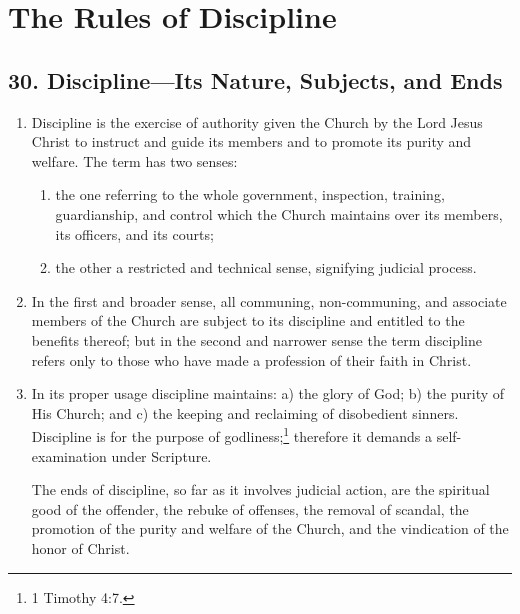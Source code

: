 \documentclass[
]{book}
\providecommand{\tightlist}{%
  \setlength{\itemsep}{0pt}\setlength{\parskip}{0pt}}
\begin{document}
\hypertarget{the-rules-of-discipline}{%
\chapter*{The Rules of Discipline}\label{the-rules-of-discipline}}

\hypertarget{disciplineits-nature-subjects-and-ends}{%
\section*{30. Discipline---Its Nature, Subjects, and Ends}\label{disciplineits-nature-subjects-and-ends}}

\protect\hypertarget{chapter-slug-30-discipline-its-nature-subjects-and-ends}{\href{}{}}

\begin{enumerate}
\def\labelenumi{\arabic{enumi}.}
\item
  \protect\hypertarget{30}{\href{}{}}Discipline is the exercise of authority given the Church by the Lord Jesus Christ to instruct and guide its members and to promote its purity and welfare. The term has two senses:

  \begin{enumerate}
  \def\labelenumii{\alph{enumii}.}
  \tightlist
  \item
    \protect\hypertarget{30.1.a}{\href{}{}}the one referring to the whole government, inspection, training, guardianship, and control which the Church maintains over its members, its officers, and its courts;
  \item
    the other a restricted and technical sense, signifying judicial process.
  \end{enumerate}
\item
  In the first and broader sense, all communing, non-communing, and associate members of the Church are subject to its discipline and entitled to the benefits thereof; but in the second and narrower sense the term discipline refers only to those who have made a profession of their faith in Christ.
\item
  In its proper usage discipline maintains: a) the glory of God; b) the purity of His Church; and c) the keeping and reclaiming of disobedient sinners. Discipline is for the purpose of godliness;\footnote{1 Timothy 4:7.} therefore it demands a self-examination under Scripture.

  The ends of discipline, so far as it involves judicial action, are the spiritual good of the offender, the rebuke of offenses, the removal of scandal, the promotion of the purity and welfare of the Church, and the vindication of the honor of Christ.
\end{enumerate}
\end{document}
